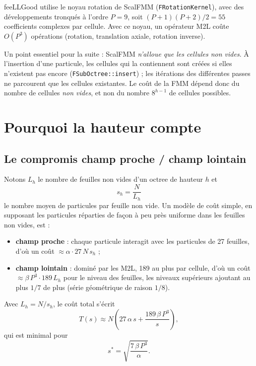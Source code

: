 \documentclass[11pt,a4paper]{article}
\newcommand{\code}[1]{\texttt{#1}}
\begin{document}
feeLLGood utilise le noyau \og rotation\fg{} de ScalFMM (\code{FRotationKernel}), avec des
développements tronqués à l'ordre $P = 9$, soit $(P+1)(P+2)/2 = 55$ coefficients complexes par
cellule. Avec ce noyau, un opérateur M2L coûte $O(P^3)$ opérations (rotation, translation axiale,
rotation inverse).

Un point essentiel pour la suite : ScalFMM \emph{n'alloue que les cellules non vides}. À
l'insertion d'une particule, les cellules qui la contiennent sont créées si elles n'existent pas
encore (\code{FSubOctree::insert}) ; les itérations des différentes passes ne parcourent que les
cellules existantes. Le coût de la FMM dépend donc du nombre de cellules \emph{non vides}, et non
du nombre $8^{h-1}$ de cellules possibles.

\section{Pourquoi la hauteur compte}

\subsection{Le compromis champ proche / champ lointain}

Notons $L_h$ le nombre de feuilles non vides d'un octree de hauteur $h$ et
\begin{equation}
s_h = \frac{N}{L_h}
\end{equation}
le nombre moyen de particules par feuille non vide. Un modèle de coût simple, en supposant les
particules réparties de façon à peu près uniforme dans les feuilles non vides, est :
\begin{itemize}
  \item \textbf{champ proche} : chaque particule interagit avec les particules de 27 feuilles,
        d'où un coût $\approx \alpha \cdot 27\, N\, s_h$ ;
  \item \textbf{champ lointain} : dominé par les M2L, 189 au plus par cellule, d'où un coût
        $\approx \beta\, P^3 \cdot 189\, L_h$ pour le niveau des feuilles, les niveaux supérieurs
        ajoutant au plus $1/7$ de plus (série géométrique de raison $1/8$).
\end{itemize}
Avec $L_h = N/s_h$, le coût total s'écrit
\begin{equation}
T(s) \approx N \left( 27\,\alpha\, s + \frac{189\,\beta\, P^3}{s} \right),
\label{eq:cost}
\end{equation}
qui est minimal pour
\begin{equation}
s^\ast = \sqrt{\frac{7\,\beta\,P^3}{\alpha}}.
\label{eq:sopt}
\end{equation}
\end{document}
